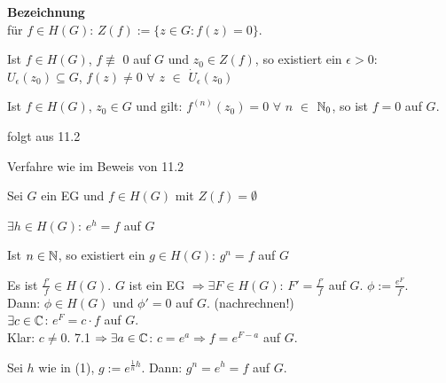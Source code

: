 \documentclass[a4paper,twoside,DIV15,BCOR12mm]{scrbook}
\begin{document}
\textbf{Bezeichnung} \\
für $f \in H(G)$: $Z(f) := \{z\in G: f(z) = 0\}$.

\begin{folgerung}
\begin{liste}
\item Ist $f \in H(G)$, $f \not\equiv$ %
$0$ auf $G$ und $z_0 \in Z(f)$, so existiert ein $\epsilon > 0$: 
\\$U_{\epsilon}(z_0) \subseteq G$, $f(z) \neq 0$ $\forall$ $z$ $\in$ $\dot U_{\epsilon}(z_0)$
\item Ist $f \in H(G)$, $z_0 \in G$ und gilt: $f^{(n)}(z_0) = 0$ $\forall$ $n$ $\in$ $\mathbb{N}_0$, so ist $f = 0$ auf $G$. 	
\end{liste}
\end{folgerung}

\begin{beweis}
\begin{liste}
\item folgt aus 11.2
\item Verfahre wie im Beweis von 11.2
\end{liste}
\end{beweis}

\begin{satz}
Sei $G$ ein EG und $f \in H(G)$ mit $Z(f) = \emptyset$
\begin{liste}
\item $\exists h \in H(G)$: $e^h = f$ auf $G$
\item Ist $n \in \mathbb{N}$, so existiert ein $g \in H(G)$: $g^n = f$ auf $G$
\end{liste}
\end{satz}

\begin{beweis}
\begin{liste}
\item Es ist $\frac{f'}{f} \in H(G)$. $G$ ist ein EG $\Rightarrow \exists F \in H(G)$: $F'= \frac{f'}{f}$ auf $G$. $\phi := \frac{e^F}{f}$.\\
Dann: $\phi \in H(G)$ und $\phi ' = 0$ auf $G$. (nachrechnen!)\\
$\exists c \in \mathbb{C}$: $e^F = c \cdot f$ auf $G$.\\
Klar: $c \neq 0$. 7.1 $\Rightarrow \exists a \in \mathbb{C}$: $c = e^a \Rightarrow f = e^{F - a}$ auf $G$.
\item Sei $h$ wie in (1), $g := e^{\frac{1}{n} h}$. Dann: $g^n = e^h = f$ auf $G$.
\end{liste}
\end{beweis}
\end{document}
